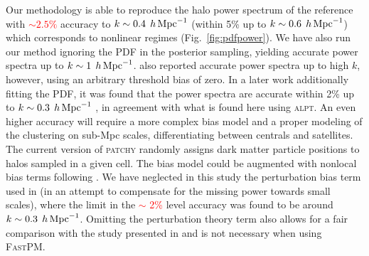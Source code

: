 \documentclass[english,usenatbib]{mn2e}
\newcommand{\tod}[1]{{\textcolor{red}{ #1}}}
\newcommand{\hperm}{\,h\,{\rm Mpc}^{-1}}
\begin{document}
Our methodology is able to reproduce the halo power spectrum of the reference with \tod{$\sim 2.5\%$} accuracy to $k \sim 0.4 \; \hperm$ (within 5\% up to $k \sim 0.6 \; \hperm$) which corresponds to  nonlinear regimes (Fig.~\ref{fig:pdfpower}). We have also run our method ignoring the PDF in the posterior sampling, yielding accurate power spectra up to $k\sim 1 \; \hperm$. \citet[][]{kitaura2014} also reported accurate power spectra up to high $k$, however, using an arbitrary threshold bias of zero. In a later work additionally fitting the PDF, it was found that the power spectra are accurate within 2\% up to $k\sim 0.3 \; \hperm$ \citep[][]{kitaura2015}, in agreement with what is found here using \textsc{alpt}. 
An even higher accuracy will require a more  complex bias model and a proper modeling of the clustering on sub-Mpc scales, differentiating between centrals and satellites. The current version of \textsc{patchy} randomly assigns dark matter particle positions to halos sampled in a given cell.
The bias model could be augmented with nonlocal bias terms following \citet[][]{mcdonald2009}. We have neglected in this study the perturbation bias term used in \citet{kitaura2016} (in an attempt to compensate for the missing power towards small scales), where the limit in the \tod{$\sim$ 2\%} level accuracy was found to be around $k\sim 0.3 \; \hperm$. Omitting the perturbation theory term also allows for a fair comparison with the study presented in \citet[][]{kitaura2015} and is not necessary when using \textsc{FastPM}. 


\end{document}
